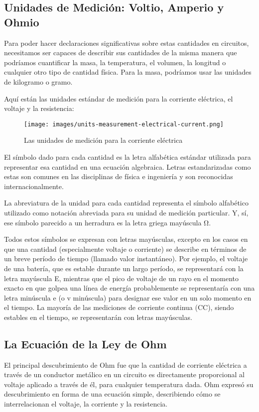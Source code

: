 \documentclass[output=paper, 
colorlinks,
citecolor=brown,
newtxmath
]{langscibook}
\begin{document}
\subsection{Unidades de Medición: Voltio, Amperio y Ohmio}
Para poder hacer declaraciones significativas sobre estas cantidades en circuitos, necesitamos ser capaces de describir sus cantidades de la misma manera que podríamos cuantificar la masa, la temperatura, el volumen, la longitud o cualquier otro tipo de cantidad física. Para la masa, podríamos usar las unidades de kilogramo o gramo.

Aquí están las unidades estándar de medición para la corriente eléctrica, el voltaje y la resistencia:

\begin{figure}
\texttt{[image: images/units-measurement-electrical-current.png]}
\caption{Las unidades de medición para la corriente eléctrica}
\label{fig:unidades}
\end{figure}

El símbolo dado para cada cantidad es la letra alfabética estándar utilizada para representar esa cantidad en una ecuación algebraica. Letras estandarizadas como estas son comunes en las disciplinas de física e ingeniería y son reconocidas internacionalmente.

La abreviatura de la unidad para cada cantidad representa el símbolo alfabético utilizado como notación abreviada para su unidad de medición particular. Y, sí, ese símbolo parecido a un herradura es la letra griega mayúscula Ω.

Todos estos símbolos se expresan con letras mayúsculas, excepto en los casos en que una cantidad (especialmente voltaje o corriente) se describe en términos de un breve período de tiempo (llamado valor instantáneo). Por ejemplo, el voltaje de una batería, que es estable durante un largo período, se representará con la letra mayúscula E, mientras que el pico de voltaje de un rayo en el momento exacto en que golpea una línea de energía probablemente se representaría con una letra minúscula e (o v minúscula) para designar ese valor en un solo momento en el tiempo. La mayoría de las mediciones de corriente continua (CC), siendo estables en el tiempo, se representarán con letras mayúsculas.


\subsection{La Ecuación de la Ley de Ohm}
El principal descubrimiento de Ohm fue que la cantidad de corriente eléctrica a través de un conductor metálico en un circuito es directamente proporcional al voltaje aplicado a través de él, para cualquier temperatura dada. Ohm expresó su descubrimiento en forma de una ecuación simple, describiendo cómo se interrelacionan el voltaje, la corriente y la resistencia.
\end{document}
